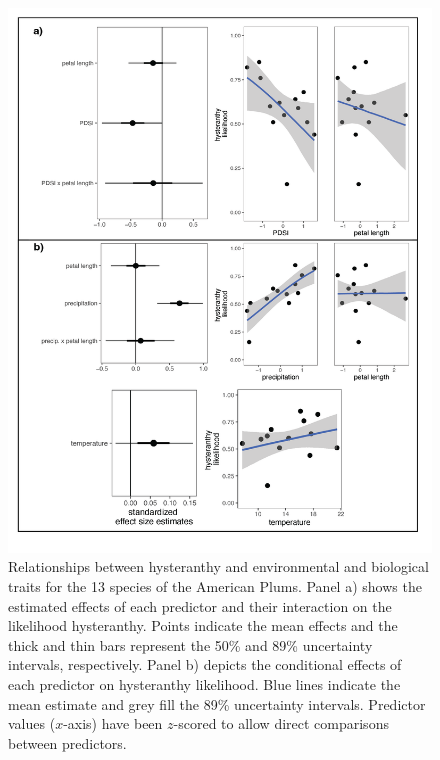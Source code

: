 \documentclass{article}[12pt]
\begin{document}
{{\begin{figure}[h!]
    \label{fig:ordinals}
\end{figure}


\begin{figure}[h!]
    \centering
 \includegraphics[width=\textwidth]{..//..//Plots/investfig3-01.png}
     \caption{Relationships between hysteranthy and environmental and biological traits for the 13 species of the American Plums. Panel a) shows the estimated effects of each predictor and their interaction on the likelihood hysteranthy. Points indicate the mean effects and the thick and thin bars represent the 50\% and 89\% uncertainty intervals, respectively. Panel b) depicts the conditional effects of each predictor on hysteranthy likelihood. Blue lines indicate the mean estimate and grey fill the 89\% uncertainty intervals.  Predictor values ($x$-axis) have been $z$-scored to allow direct comparisons between predictors.}

    \label{fig:prunes}
\end{figure}


}}
\end{document}
